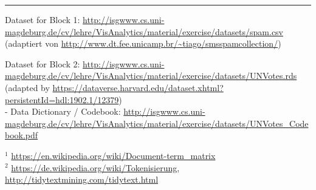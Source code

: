 \documentclass[11pt,]{article}
\begin{document}
\begin{center}\rule{0.5\linewidth}{\linethickness}\end{center}

Dataset for Block 1:
\url{http://isgwww.cs.uni-magdeburg.de/cv/lehre/VisAnalytics/material/exercise/datasets/spam.csv}\\
(adaptiert von
\url{http://www.dt.fee.unicamp.br/~tiago/smsspamcollection/})

Dataset for Block 2:
\url{http://isgwww.cs.uni-magdeburg.de/cv/lehre/VisAnalytics/material/exercise/datasets/UNVotes.rds}\\
(adapted by
\url{https://dataverse.harvard.edu/dataset.xhtml?persistentId=hdl:1902.1/12379})\\
- Data Dictionary / Codebook:
\url{http://isgwww.cs.uni-magdeburg.de/cv/lehre/VisAnalytics/material/exercise/datasets/UNVotes_Codebook.pdf}

\(^1\) \url{https://en.wikipedia.org/wiki/Document-term_matrix}\\
\(^2\) \url{https://de.wikipedia.org/wiki/Tokenisierung},
\url{http://tidytextmining.com/tidytext.html}
\end{document}
